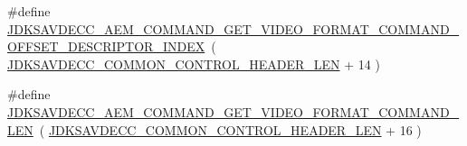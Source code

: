 \begin{DoxyCompactItemize}
\item 
\#define \hyperlink{group__command__get__video__format_ga9a9b9f8df78a1ade3269814efcb98ca2}{J\+D\+K\+S\+A\+V\+D\+E\+C\+C\+\_\+\+A\+E\+M\+\_\+\+C\+O\+M\+M\+A\+N\+D\+\_\+\+G\+E\+T\+\_\+\+V\+I\+D\+E\+O\+\_\+\+F\+O\+R\+M\+A\+T\+\_\+\+C\+O\+M\+M\+A\+N\+D\+\_\+\+O\+F\+F\+S\+E\+T\+\_\+\+D\+E\+S\+C\+R\+I\+P\+T\+O\+R\+\_\+\+I\+N\+D\+EX}~( \hyperlink{group__jdksavdecc__avtp__common__control__header_gaae84052886fb1bb42f3bc5f85b741dff}{J\+D\+K\+S\+A\+V\+D\+E\+C\+C\+\_\+\+C\+O\+M\+M\+O\+N\+\_\+\+C\+O\+N\+T\+R\+O\+L\+\_\+\+H\+E\+A\+D\+E\+R\+\_\+\+L\+EN} + 14 )
\item 
\#define \hyperlink{group__command__get__video__format_ga55e42fb95e9838b6a467f7918c9a195a}{J\+D\+K\+S\+A\+V\+D\+E\+C\+C\+\_\+\+A\+E\+M\+\_\+\+C\+O\+M\+M\+A\+N\+D\+\_\+\+G\+E\+T\+\_\+\+V\+I\+D\+E\+O\+\_\+\+F\+O\+R\+M\+A\+T\+\_\+\+C\+O\+M\+M\+A\+N\+D\+\_\+\+L\+EN}~( \hyperlink{group__jdksavdecc__avtp__common__control__header_gaae84052886fb1bb42f3bc5f85b741dff}{J\+D\+K\+S\+A\+V\+D\+E\+C\+C\+\_\+\+C\+O\+M\+M\+O\+N\+\_\+\+C\+O\+N\+T\+R\+O\+L\+\_\+\+H\+E\+A\+D\+E\+R\+\_\+\+L\+EN} + 16 )
\end{DoxyCompactItemize}

